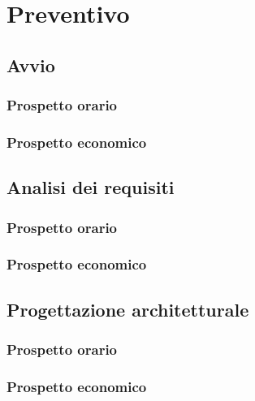 \section{Preventivo}



\subsection{Avvio}

\subsubsection{Prospetto orario}



\subsubsection{Prospetto economico}





\subsection{Analisi dei requisiti}

\subsubsection{Prospetto orario}



\subsubsection{Prospetto economico}





\subsection{Progettazione architetturale}

\subsubsection{Prospetto orario}



\subsubsection{Prospetto economico}





